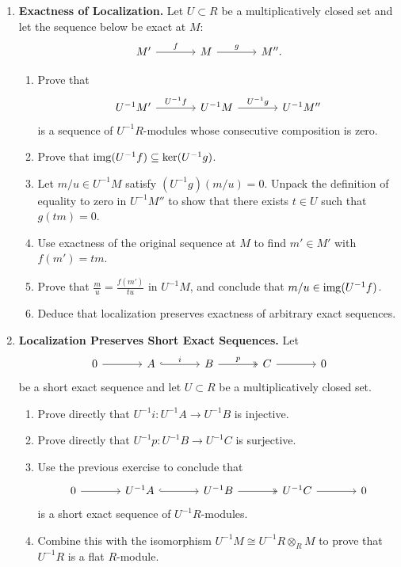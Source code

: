 \documentclass[12pt,reqno]{amsart}
\begin{document}
\begin{enumerate}[leftmargin=*, resume=problems]

\item \textbf{Exactness of Localization.} Let $U\subset R$ be a multiplicatively closed set and let the sequence below be exact at $M$:
\[
\begin{tikzcd}[column sep=large]
M' \arrow[r, "f"] & M \arrow[r, "g"] & M''.
\end{tikzcd}
\]
\begin{enumerate}
\item Prove that
\[
\begin{tikzcd}[column sep=large]
U^{-1}M' \arrow[r, "U^{-1}f"] & U^{-1}M \arrow[r, "U^{-1}g"] & U^{-1}M''
\end{tikzcd}
\]
is a sequence of $U^{-1}R$-modules whose consecutive composition is zero.
\item Prove that $\operatorname{img}(U^{-1}f)\subseteq \ker(U^{-1}g)$.
\item Let $m/u\in U^{-1}M$ satisfy $(U^{-1}g)(m/u)=0$. Unpack the definition of equality to zero in $U^{-1}M''$ to show that there exists $t\in U$ such that $g(tm)=0$.
\item Use exactness of the original sequence at $M$ to find $m'\in M'$ with $f(m')=tm$.
\item Prove that $\frac{m}{u}=\frac{f(m')}{tu}$ in $U^{-1}M$, and conclude that $m/u\in \operatorname{img}(U^{-1}f)$.
\item Deduce that localization preserves exactness of arbitrary exact sequences. 
\end{enumerate}

\item \textbf{Localization Preserves Short Exact Sequences.} Let
\[
\begin{tikzcd}[column sep=large]
0 \arrow[r] & A \arrow[r, hook, "i"] & B \arrow[r, two heads, "p"] & C \arrow[r] & 0
\end{tikzcd}
\]
be a short exact sequence and let $U\subset R$ be a multiplicatively closed set.
\begin{enumerate}
\item Prove directly that $U^{-1}i:U^{-1}A\to U^{-1}B$ is injective.
\item Prove directly that $U^{-1}p:U^{-1}B\to U^{-1}C$ is surjective.
\item Use the previous exercise to conclude that
\[
\begin{tikzcd}[column sep=large]
0 \arrow[r] & U^{-1}A \arrow[r, hook] & U^{-1}B \arrow[r, two heads] & U^{-1}C \arrow[r] & 0
\end{tikzcd}
\]
is a short exact sequence of $U^{-1}R$-modules.
\item Combine this with the isomorphism $U^{-1}M\cong U^{-1}R\otimes_R M$ to prove that $U^{-1}R$ is a flat $R$-module.
\end{enumerate}


\end{enumerate}
\end{document}
